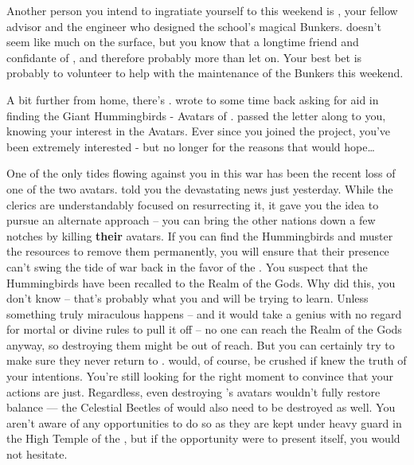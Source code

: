 \documentclass[char]{GL2020}
\begin{document}
Another person you intend to ingratiate yourself to this weekend is \cBunker{\full}, your fellow advisor and the engineer who designed the school's magical Bunkers. \cBunker{} doesn't seem like much on the surface, but you know that \cBunker{\theyare} a longtime friend and confidante of \cHeadDiplomat{}, and therefore probably more than \cBunker{\they} let\cBunker{\plural} on. Your best bet is probably to volunteer to help \cBunker{} with the maintenance of the Bunkers this weekend.

A bit further from home, there's \cDisney{\full}. \cDisney{\They} wrote to \cHeadDiplomat{} some time back asking for aid in finding the Giant Hummingbirds - Avatars of \cFarmGod{}. \cHeadDiplomat{} passed the letter along to you, knowing your interest in the Avatars.  Ever since you joined the project, you've been extremely interested - but no longer for the reasons that \cDisney{} would hope\ldots{}

One of the only tides flowing against you in this war has been the recent loss of one of the two \pShip{} avatars. \cEbbPriest{} told you the devastating news just yesterday. While the clerics are understandably focused on resurrecting it, it gave you the idea to pursue an alternate approach – you can bring the other nations down a few notches by killing \textbf{their} avatars. If you can find the Hummingbirds and muster the resources to remove them permanently, you will ensure that their presence can't swing the tide of war back in the favor of the \pFarm{}. You suspect that the Hummingbirds have been recalled to the Realm of the Gods. Why \cFarmGod{} did this, you don't know -- that's probably what you and \cDisney{} will be trying to learn. Unless something truly miraculous happens – and it would take a genius with no regard for mortal or divine rules to pull it off – no one can reach the Realm of the Gods anyway, so destroying them might be out of reach. But you can certainly try to make sure they never return to \pEarth{}. \cDisney{} would, of course, be crushed if \cDisney{\they} knew the truth of your intentions. You're still looking for the right moment to convince \cDisney{\them} that your actions are just. Regardless, even destroying \cFarmGod{}'s avatars wouldn't fully restore balance — the Celestial Beetles of \cTechGod{} would also need to be destroyed as well. You aren't aware of any opportunities to do so as they are kept under heavy guard in the High Temple of the \pTech{}, but if the opportunity were to present itself, you would not hesitate.
\end{document}
